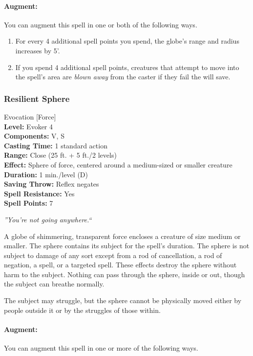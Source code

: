 \paragraph{Augment:} You can augment this spell in one or both of the following ways.
\begin{enumerate}
 \item For every 4 additional spell points you spend, the globe's range and radius increases by 5'.
 \item If you spend 4 additional spell points, creatures that attempt to move into the spell's area are \emph{blown away} from the caster if they fail the will save.
\end{enumerate}


\subsubsection{Resilient Sphere}
\label{Spell:ResilientSphere}
Evocation [Force]
\\ \textbf{Level:} Evoker 4
\\ \textbf{Components:} V, S
\\ \textbf{Casting Time:} 1 standard action
\\ \textbf{Range:} Close (25 ft. + 5 ft./2 levels)
\\ \textbf{Effect:} Sphere of force, centered around a medium-sized or smaller creature
\\ \textbf{Duration:} 1 min./level (D)
\\ \textbf{Saving Throw:} Reflex negates
\\ \textbf{Spell Resistance:} Yes
\\ \textbf{Spell Points:} 7

\emph{''You're not going anywhere.``}

A globe of shimmering, transparent force encloses a creature of size medium or smaller. 
The sphere contains its subject for the spell's duration. 
The sphere is not subject to damage of any sort except from a rod of cancellation, 
a rod of negation, a  spell, or a targeted  spell. 
These effects destroy the sphere without harm to the subject. 
Nothing can pass through the sphere, inside or out, though the subject can breathe normally.

The subject may struggle, but the sphere cannot be physically moved either by people outside it or by the struggles of those within.

\paragraph{Augment:} You can augment this spell in one or more of the following ways.

